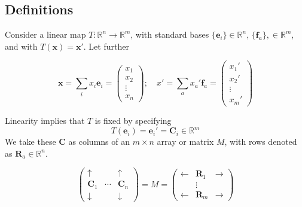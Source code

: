 \documentclass{article}
\begin{document}
	\subsection{Definitions}
	Consider a linear map $T: \mathbb R^n \to \mathbb R^m$, with standard bases $\{ \bm e_i \} \in \mathbb R^n$, $\{ \bm f_a \}, \in \mathbb R^m$, and with $T(\bm x) = \bm x'$.
	Let further
	
	\[ \bm x = \sum_i x_i \bm e_i = \begin{pmatrix}
		x_1 \\ x_2 \\ \vdots \\ x_n
	\end{pmatrix};\quad x' = \sum_a x_a' \bm f_a = \begin{pmatrix}
		x_1' \\ x_2' \\ \vdots \\ x_m'
	\end{pmatrix} \]

	Linearity implies that $T$ is fixed by specifying
	\[ T(\bm e_i) = \bm e_i' = \bm C_i \in \mathbb R^m \]
	We take these $\bm C$ as columns of an $m \times n$ array or matrix $M$, with rows denoted as $\bm R_a \in \mathbb R^n$.

	\[ \begin{pmatrix}
		\uparrow & & \uparrow \\
		\bm C_1 & \cdots & \bm C_n \\
		\downarrow & & \downarrow
	\end{pmatrix} = M = \begin{pmatrix}
		\leftarrow & \bm R_1 & \rightarrow \\
		& \vdots & \\
		\leftarrow & \bm R_m & \rightarrow
	\end{pmatrix} \]
\end{document}
